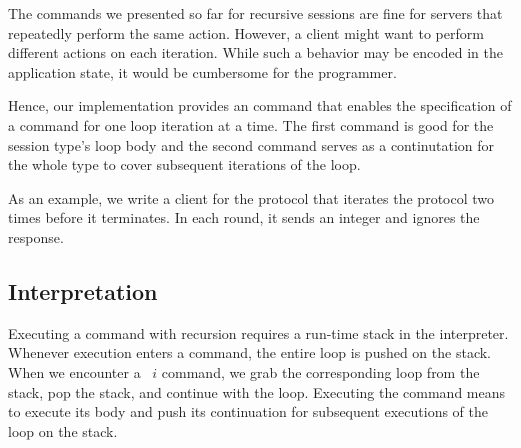 \documentclass[acmsmall,review,anonymous,screen]{acmart}
\begin{document}
The commands we presented so far for recursive sessions are fine for
servers that repeatedly perform the same action. However, a client
might want to perform different actions on each iteration. While such
a behavior may be encoded in the application state, it would be cumbersome for the programmer.

Hence, our implementation provides an {\AUNROLL} command that
enables the specification of a command for one loop iteration at a time.
\rstCommandUNROLL
The first command is good for the session type's loop body and the
second command serves as a continutation for the whole type to cover subsequent
iterations of the loop. 

As an example, we write a client for the {\Amanyunaryp} protocol that
iterates the protocol two times before it terminates. In each round,
it sends an integer and ignores the response.
\rstClientExample

\subsection{Interpretation}
\label{sec:interpretaion}


Executing a command with recursion requires a run-time stack in the
interpreter. Whenever execution enters a {\AMU} command, the entire
loop is pushed on the stack. When we encounter a {\ACONTINUE~$i$}
command, we grab the corresponding loop from the stack, pop the stack, and
continue with the loop.
Executing the {\AUNROLL} command means to execute its body and push its
continuation for subsequent executions of the loop on the stack.
\end{document}
